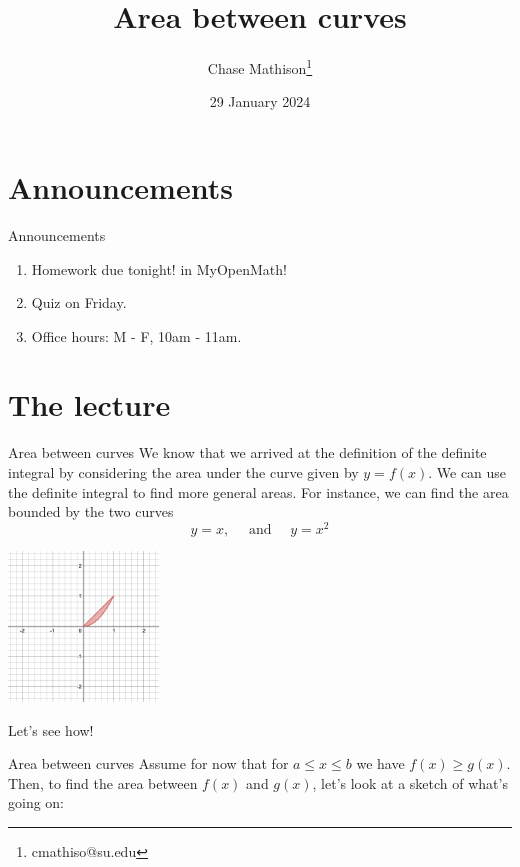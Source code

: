 \documentclass[presentation]{beamer}
\institute[SU]{Shenandoah University}
\author{Chase Mathison\thanks{cmathiso@su.edu}}
\date{29 January 2024}
\title{Area between curves}
\begin{document}
\maketitle

\section{Announcements}
\label{sec:orgf77aaff}
\begin{frame}[label={sec:org8caf16e}]{Announcements}
\begin{enumerate}
\item Homework due tonight! in MyOpenMath!
\item Quiz on Friday.
\item Office hours: M - F, 10am - 11am.
\end{enumerate}
\end{frame}

\section{The lecture}
\label{sec:orgbe84ae6}
\begin{frame}[label={sec:org20d7997}]{Area between curves}
We know that we arrived at the definition of the definite integral by
considering the area under the curve given by \(y = f(x)\).  
We can use the definite integral to find more general areas.  For instance,
we can find the area bounded by the two curves
\[ y = x,\quad \text{ and } \quad y = x^2 \]
\begin{center}
\includegraphics[width=0.3\textwidth]{../img/day004-ex1.png}
\end{center}
Let's see how!
\end{frame}

\begin{frame}[label={sec:orgaa3491a}]{Area between curves}
Assume for now that for \(a \le x \le b\) we have \(f(x) \ge g(x)\).  Then, to find the area between \(f(x)\) and \(g(x)\), let's
look at a sketch of what's going on:

\vspace{10in}
\end{frame}
\end{document}
